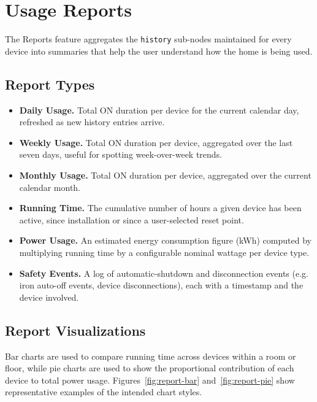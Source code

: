 \documentclass[11pt,a4paper]{article}
\begin{document}
\section{Usage Reports}
\label{sec:reports}

The Reports feature aggregates the \texttt{history} sub-nodes maintained for every device into summaries that help the user understand how the home is being used.

\subsection{Report Types}
\begin{itemize}
    \item \textbf{Daily Usage.} Total ON duration per device for the current calendar day, refreshed as new history entries arrive.
    \item \textbf{Weekly Usage.} Total ON duration per device, aggregated over the last seven days, useful for spotting week-over-week trends.
    \item \textbf{Monthly Usage.} Total ON duration per device, aggregated over the current calendar month.
    \item \textbf{Running Time.} The cumulative number of hours a given device has been active, since installation or since a user-selected reset point.
    \item \textbf{Power Usage.} An estimated energy consumption figure (kWh) computed by multiplying running time by a configurable nominal wattage per device type.
    \item \textbf{Safety Events.} A log of automatic-shutdown and disconnection events (e.g. iron auto-off events, device disconnections), each with a timestamp and the device involved.
\end{itemize}

\subsection{Report Visualizations}
Bar charts are used to compare running time across devices within a room or floor, while pie charts are used to show the proportional contribution of each device to total power usage. Figures~\ref{fig:report-bar} and~\ref{fig:report-pie} show representative examples of the intended chart styles.
\end{document}
